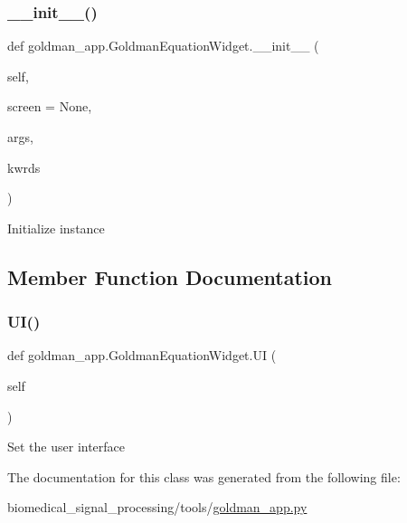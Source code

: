 \subsubsection{\texorpdfstring{\+\_\+\+\_\+init\+\_\+\+\_\+()}{\_\_init\_\_()}}
{\footnotesize\ttfamily def goldman\+\_\+app.\+Goldman\+Equation\+Widget.\+\_\+\+\_\+init\+\_\+\+\_\+ (\begin{DoxyParamCaption}\item[{}]{self,  }\item[{}]{screen = {\ttfamily None},  }\item[{}]{args,  }\item[{}]{kwrds }\end{DoxyParamCaption})}

\begin{DoxyVerb}Initialize instance
\end{DoxyVerb}
 

\subsection{Member Function Documentation}
\mbox{\label{classgoldman__app_1_1GoldmanEquationWidget_a0366838001fc830f1075d78ffd3c99c2}} 
\subsubsection{\texorpdfstring{U\+I()}{UI()}}
{\footnotesize\ttfamily def goldman\+\_\+app.\+Goldman\+Equation\+Widget.\+UI (\begin{DoxyParamCaption}\item[{}]{self }\end{DoxyParamCaption})}

\begin{DoxyVerb}Set the user interface
\end{DoxyVerb}
 

The documentation for this class was generated from the following file\+:\begin{DoxyCompactItemize}
\item 
biomedical\+\_\+signal\+\_\+processing/tools/\hyperlink{goldman__app_8py}{goldman\+\_\+app.\+py}\end{DoxyCompactItemize}
